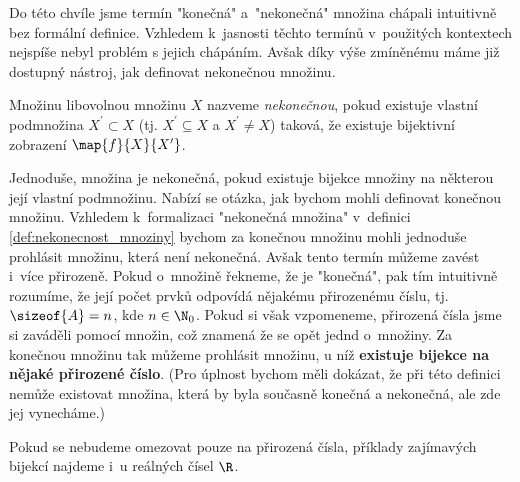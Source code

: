 Do této chvíle jsme termín "konečná" a~"nekonečná" množina chápali intuitivně bez formální definice. Vzhledem k~jasnosti těchto termínů v~použitých kontextech nejspíše nebyl problém s jejich chápáním. Avšak díky výše zmíněnému máme již dostupný nástroj, jak definovat nekonečnou množinu.
\begin{definition}\label{def:nekonecnost_mnoziny}
    Množinu libovolnou množinu $X$ nazveme \emph{nekonečnou}, pokud existuje vlastní podmnožina $X^\prime\subset X$ (tj. $X^\prime\subseteq X$ a $X^\prime\neq X$) taková, že existuje bijektivní zobrazení $\map{f}{X}{X^\prime}$. 
\end{definition}
Jednoduše, množina je nekonečná, pokud existuje bijekce množiny na některou její vlastní podmnožinu. Nabízí se otázka, jak bychom mohli definovat konečnou množinu. Vzhledem k~formalizaci "nekonečná množina" v~definici \ref{def:nekonecnost_mnoziny} bychom za konečnou množinu mohli jednoduše prohlásit množinu, která není nekonečná. Avšak tento termín můžeme zavést i~více přirozeně. Pokud o~množině řekneme, že je "konečná", pak tím intuitivně rozumíme, že její počet prvků odpovídá nějakému přirozenému číslu, tj. $\sizeof{A}=n$, kde $n\in\N_0$. Pokud si však vzpomeneme, přirozená čísla jsme si zaváděli pomocí množin, což znamená že se opět jednd o~množiny. Za konečnou množinu tak můžeme prohlásit množinu, u níž \textbf{existuje bijekce na nějaké přirozené číslo}. (Pro úplnost bychom měli dokázat, že při této definici nemůže existovat množina, která by byla současně konečná a nekonečná, ale zde jej vynecháme.)\par
Pokud se nebudeme omezovat pouze na přirozená čísla, příklady zajímavých bijekcí najdeme i~u reálných čísel $\R$.
